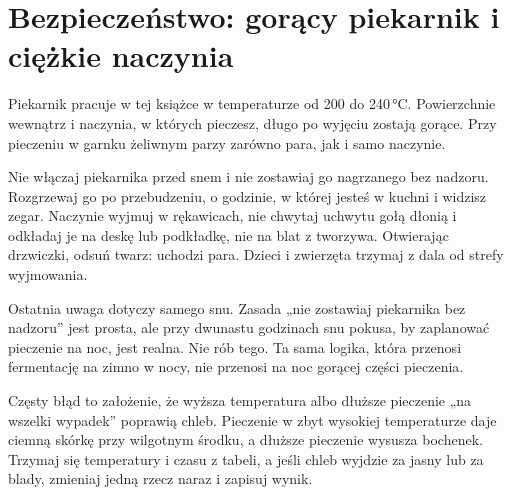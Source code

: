 \section{Bezpieczeństwo: gorący piekarnik i ciężkie naczynia}

Piekarnik pracuje w tej książce w temperaturze od 200 do 240\,°C. Powierzchnie wewnątrz i naczynia, w których pieczesz, długo po wyjęciu zostają gorące. Przy pieczeniu w garnku żeliwnym parzy zarówno para, jak i samo naczynie.

\begin{piekarnik}
Nie włączaj piekarnika przed snem i nie zostawiaj go nagrzanego bez nadzoru. Rozgrzewaj go po przebudzeniu, o godzinie, w której jesteś w kuchni i widzisz zegar. Naczynie wyjmuj w rękawicach, nie chwytaj uchwytu gołą dłonią i odkładaj je na deskę lub podkładkę, nie na blat z tworzywa. Otwierając drzwiczki, odsuń twarz: uchodzi para. Dzieci i zwierzęta trzymaj z dala od strefy wyjmowania.
\end{piekarnik}

Ostatnia uwaga dotyczy samego snu. Zasada „nie zostawiaj piekarnika bez nadzoru” jest prosta, ale przy dwunastu godzinach snu pokusa, by zaplanować pieczenie na noc, jest realna. Nie rób tego. Ta sama logika, która przenosi fermentację na zimno w nocy, nie przenosi na noc gorącej części pieczenia.

\begin{falle}
Częsty błąd to założenie, że wyższa temperatura albo dłuższe pieczenie „na wszelki wypadek” poprawią chleb. Pieczenie w zbyt wysokiej temperaturze daje ciemną skórkę przy wilgotnym środku, a dłuższe pieczenie wysusza bochenek. Trzymaj się temperatury i czasu z tabeli, a jeśli chleb wyjdzie za jasny lub za blady, zmieniaj jedną rzecz naraz i zapisuj wynik.
\end{falle}

